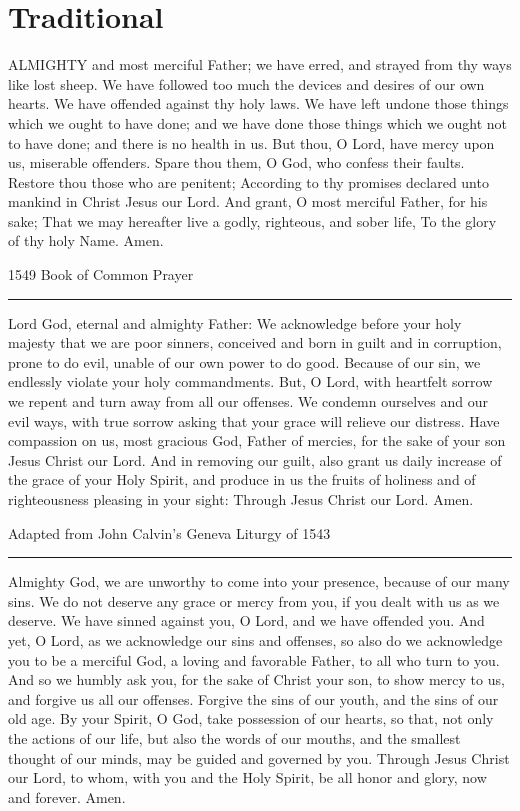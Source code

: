 \documentclass[]{book}
\begin{document}
\hypertarget{traditional}{%
\section{Traditional}\label{traditional}}

ALMIGHTY and most merciful Father; we have erred, and strayed from thy ways like lost sheep. We have followed too much the devices and desires of our own hearts. We have offended against thy holy laws. We have left undone those things which we ought to have done; and we have done those things which we ought not to have done; and there is no health in us. But thou, O Lord, have mercy upon us, miserable offenders. Spare thou them, O God, who confess their faults. Restore thou those who are penitent; According to thy promises declared unto mankind in Christ Jesus our Lord. And grant, O most merciful Father, for his sake; That we may hereafter live a godly, righteous, and sober life, To the glory of thy holy Name. Amen.

1549 Book of Common Prayer

\begin{center}\rule{0.5\linewidth}{\linethickness}\end{center}

Lord God, eternal and almighty Father: We acknowledge before your holy majesty that we are poor sinners, conceived and born in guilt and in corruption, prone to do evil, unable of our own power to do good. Because of our sin, we endlessly violate your holy commandments. But, O Lord, with heartfelt sorrow we repent and turn away from all our offenses. We condemn ourselves and our evil ways, with true sorrow asking that your grace will relieve our distress. Have compassion on us, most gracious God, Father of mercies, for the sake of your son Jesus Christ our Lord. And in removing our guilt, also grant us daily increase of the grace of your Holy Spirit, and produce in us the fruits of holiness and of righteousness pleasing in your sight: Through Jesus Christ our Lord. Amen.

Adapted from John Calvin's Geneva Liturgy of 1543

\begin{center}\rule{0.5\linewidth}{\linethickness}\end{center}

Almighty God, we are unworthy to come into your presence, because of our many sins. We do not deserve any grace or mercy from you, if you dealt with us as we deserve. We have sinned against you, O Lord, and we have offended you. And yet, O Lord, as we acknowledge our sins and offenses, so also do we acknowledge you to be a merciful God, a loving and favorable Father, to all who turn to you. And so we humbly ask you, for the sake of Christ your son, to show mercy to us, and forgive us all our offenses. Forgive the sins of our youth, and the sins of our old age. By your Spirit, O God, take possession of our hearts, so that, not only the actions of our life, but also the words of our mouths, and the smallest thought of our minds, may be guided and governed by you. Through Jesus Christ our Lord, to whom, with you and the Holy Spirit, be all honor and glory, now and forever. Amen.
\end{document}
